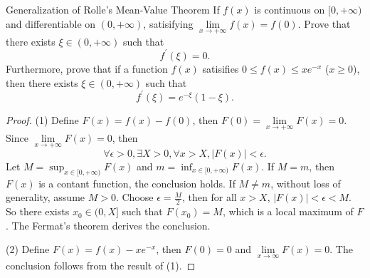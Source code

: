 \begin{example}{Generalization of Rolle's Mean-Value Theorem}{}
  If $f(x)$ is continuous on $[0, +\infty)$ and differentiable on $(0,
  +\infty)$, satisifying $\lim \limits _{x \rightarrow +\infty}f(x) = f(0)$.
  Prove that there exists $\xi \in (0, +\infty)$ such that
  \begin{equation}
    f^{\prime}(\xi) = 0.
  \end{equation}
  Furthermore, prove that if a function $f(x)$ satisifies $0 \leq f(x) \leq
  xe^{-x}$ ($x \geq 0$), then there exists $\xi \in (0, +\infty)$ such that
  \begin{equation}
    f^{\prime}(\xi) = e^{-\xi} (1 - \xi).
  \end{equation}
\end{example}

\begin{proof}
  (1) Define $F(x) = f(x) - f(0)$, then $F(0) = \lim \limits _{x \rightarrow
    +\infty}F(x) = 0$.
  Since $\lim \limits _{x \rightarrow +\infty}F(x) = 0$, then
  \begin{equation}
    \forall \epsilon > 0, \exists X > 0, \forall x > X, |F(x)| < \epsilon.
  \end{equation}
  Let $M = \sup_{x \in [0, +\infty)}F(x)$ and $m = \inf _{x \in [0, +\infty)} F(x)$.
  If $M = m$, then $F(x)$ is a contant function, the conclusion holds.
  If $M \neq m$, without loss of generality, assume $M > 0$.
  Choose $\epsilon = \frac{M}{2}$, then for all $x > X$, $|F(x)| < \epsilon < M$.
  So there exists $x_0 \in (0, X]$ such that $F(x_0) = M$,
  which is a local maximum of $F$. The Fermat's theorem derives the conclusion.

  (2) Define $F(x) = f(x) - xe^{-x}$, then $F(0) = 0$ and $\lim \limits _{x
    \rightarrow \infty}F(x) = 0$. The conclusion follows from the result of (1).
\end{proof}

